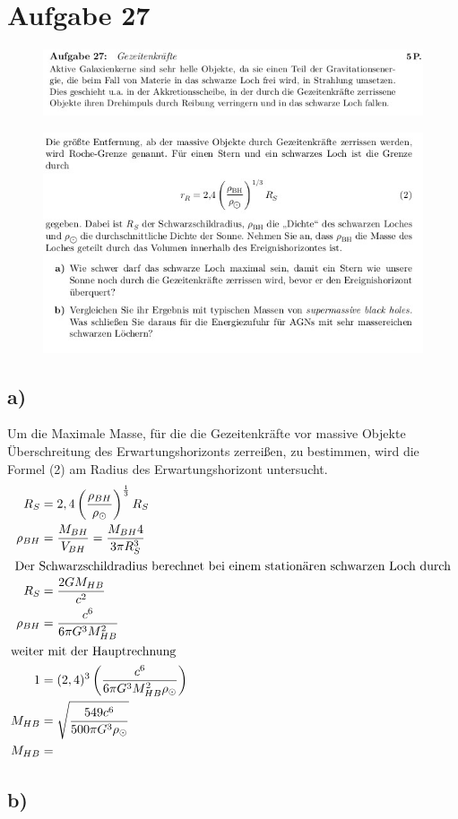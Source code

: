 \section{Aufgabe 27}
\begin{figure}[H]
    \centering
    \includegraphics[width=\textwidth]{images/ex27_1.jpg}
\end{figure}
\begin{figure}[H]
    \centering
    \includegraphics[width=\textwidth]{images/ex27_2.jpg}
\end{figure}



\subsection{a)}
Um die Maximale Masse, für die die Gezeitenkräfte vor massive Objekte Überschreitung des Erwartungshorizonts
zerreißen, zu bestimmen, wird die Formel (2) am Radius des Erwartungshorizont untersucht.
\begin{align}
    R_S &= 2,4 \left( \frac{\rho _{BH}}{\rho _{\odot}} \right)^{\frac{1}{3}} R_S \\
    \rho _{BH} &= \frac{M_{BH}}{V_{BH}} = \frac{M_{BH}4}{3 \pi R_S^3}\\
    \intertext{
        Der Schwarzschildradius berechnet bei einem stationären schwarzen Loch durch
    }
    R_S &= \frac{2GM_{HB}}{c^2}\\
    \rho_{BH} &= \frac{ c^6}{6 \pi G^3 M_{HB}^2} \\
    \intertext{weiter mit der Hauptrechnung}
    1 &= (2,4)^3 \left( \frac{c^6}{6 \pi G^3 M_{HB}^2 \rho _{\odot}} \right)\\
    M_{HB} &= \sqrt{ \frac{549 c^6}{500 \pi G^3 \rho _{\odot} } }\\
    M_{HB} &= \text{}
\end{align}


\subsection{b)}










